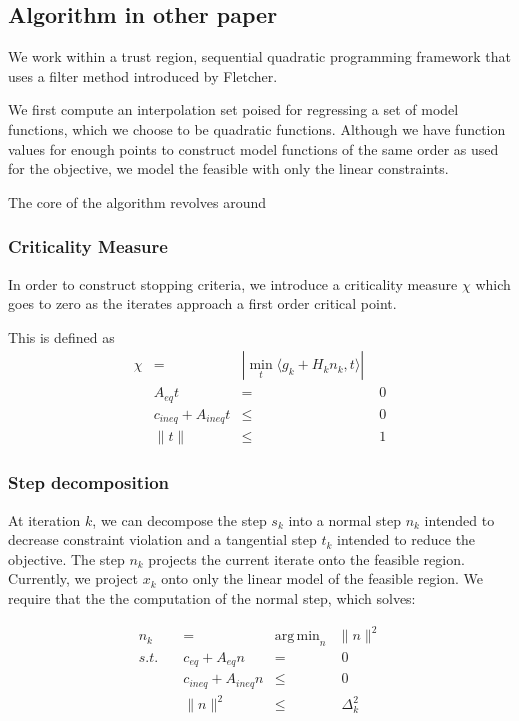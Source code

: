 \documentclass{article}
\DeclareMathOperator*{\argmin}{arg\,min}
\begin{document}
\subsection{Algorithm in other paper}


We work within a trust region, sequential quadratic programming framework that uses a filter method introduced by Fletcher.

We first compute an interpolation set poised for regressing a set of model functions, which we choose to be quadratic functions.
Although we have function values for enough points to construct model functions of the same order as used for the objective, we model the feasible with only the linear constraints.

The core of the algorithm revolves around


\subsubsection{Criticality Measure}
In order to construct stopping criteria, we introduce a criticality measure $\chi$ which goes to zero as the iterates approach a first order critical point.

This is defined as
\begin{align*}
\chi & = & |\min_t \langle g_k + H_kn_k, t\rangle| \\
& A_{eq}t &=& \; 0 \\
& c_{ineq} + A_{ineq}t &\le& \; 0 \\
& \| t \| &\le& \; 1
\end{align*}



\subsubsection{Step decomposition}
At iteration $k$, we can decompose the step $s_k$ into a normal step $n_k$ intended to decrease constraint violation and a tangential step $t_k$ intended to reduce the objective.
The step $n_k$ projects the current iterate onto the feasible region.
Currently, we project $x_k$ onto only the linear model of the feasible region.
We require that the the computation of the normal step, which solves:

\begin{align*}
n_k &=& \argmin_n           & \|n\|^2 \\
s.t. \quad & c_{eq} + A_{eq}n     &=&\; 0 \\
     & c_{ineq} + A_{ineq}n &\le& \; 0  \\
     & \| n \|^2            &\le& \; \Delta_k^2
\end{align*}
\end{document}
